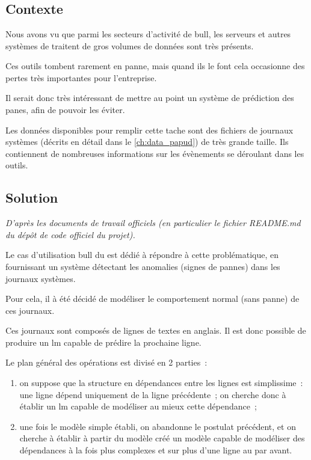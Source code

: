 \chapter{\label{ch:project_papud}}
\section{Contexte}
Nous avons vu que parmi les secteurs d'activité de \gls{bull}, les serveurs et autres systèmes de traitent de gros volumes de données sont très présents.

Ces outils tombent rarement en panne, mais quand ils le font cela occasionne des pertes très importantes pour l'entreprise.

Il serait donc très intéressant de mettre au point un système de prédiction des panes, afin de pouvoir les éviter.

Les données disponibles pour remplir cette tache sont des fichiers de journaux systèmes (décrits en détail dans le \autoref{ch:data_papud}) de très grande taille.
Ils contiennent de nombreuses informations sur les évènements se déroulant dans les outils.

\section{Solution}
\textit{D'après les documents de travail officiels (en particulier le fichier README.md du dépôt de code officiel du projet).}

Le cas d'utilisation \gls{bull} du  est dédié à répondre à cette problématique, en fournissant un système détectant les anomalies (signes de pannes) dans les journaux systèmes.

Pour cela, il à été décidé de modéliser le comportement normal (sans panne) de ces journaux.

Ces journaux sont composés de lignes de textes en anglais. Il est donc possible de produire un \gls{lm} capable de prédire la prochaine ligne.

Le plan général des opérations est divisé en 2 parties~: %
\begin{enumerate}
	\item on suppose que la structure en dépendances entre les lignes est simplissime~: une ligne dépend uniquement de la ligne précédente~; on cherche donc à établir un \gls{lm} capable de modéliser au mieux cette dépendance~;
	\item une fois le modèle simple établi, on abandonne le postulat précédent, et on cherche à établir à partir du modèle créé un modèle capable de modéliser des dépendances à la fois plus complexes et sur plus d'une ligne au par avant.
\end{enumerate}
\hspace{1em}

